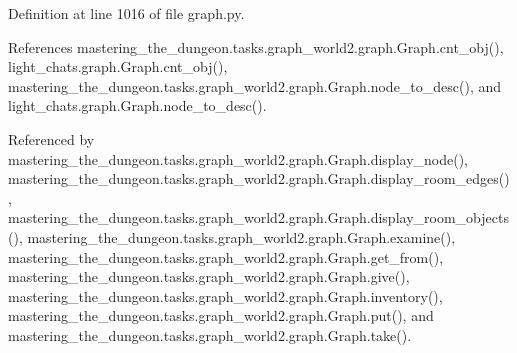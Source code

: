 Definition at line 1016 of file graph.\+py.



References mastering\+\_\+the\+\_\+dungeon.\+tasks.\+graph\+\_\+world2.\+graph.\+Graph.\+cnt\+\_\+obj(), light\+\_\+chats.\+graph.\+Graph.\+cnt\+\_\+obj(), mastering\+\_\+the\+\_\+dungeon.\+tasks.\+graph\+\_\+world2.\+graph.\+Graph.\+node\+\_\+to\+\_\+desc(), and light\+\_\+chats.\+graph.\+Graph.\+node\+\_\+to\+\_\+desc().



Referenced by mastering\+\_\+the\+\_\+dungeon.\+tasks.\+graph\+\_\+world2.\+graph.\+Graph.\+display\+\_\+node(), mastering\+\_\+the\+\_\+dungeon.\+tasks.\+graph\+\_\+world2.\+graph.\+Graph.\+display\+\_\+room\+\_\+edges(), mastering\+\_\+the\+\_\+dungeon.\+tasks.\+graph\+\_\+world2.\+graph.\+Graph.\+display\+\_\+room\+\_\+objects(), mastering\+\_\+the\+\_\+dungeon.\+tasks.\+graph\+\_\+world2.\+graph.\+Graph.\+examine(), mastering\+\_\+the\+\_\+dungeon.\+tasks.\+graph\+\_\+world2.\+graph.\+Graph.\+get\+\_\+from(), mastering\+\_\+the\+\_\+dungeon.\+tasks.\+graph\+\_\+world2.\+graph.\+Graph.\+give(), mastering\+\_\+the\+\_\+dungeon.\+tasks.\+graph\+\_\+world2.\+graph.\+Graph.\+inventory(), mastering\+\_\+the\+\_\+dungeon.\+tasks.\+graph\+\_\+world2.\+graph.\+Graph.\+put(), and mastering\+\_\+the\+\_\+dungeon.\+tasks.\+graph\+\_\+world2.\+graph.\+Graph.\+take().

